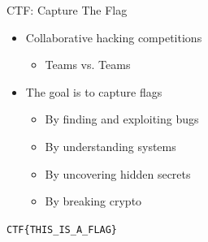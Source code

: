 {
\begin{frame}[t,plain]
    \titlepage
\end{frame}
}

\begin{frame}[fragile]
  {CTF: Capture The Flag}

  \begin{itemize}
    \item Collaborative hacking competitions
    \begin{itemize}
    	\item Teams vs. Teams
    \end{itemize}
    \item The goal is to capture flags
    \begin{itemize}
    	\item By finding and exploiting bugs
    	\item By understanding systems
    	\item By uncovering hidden secrets
    	\item By breaking crypto
    \end{itemize}
  \end{itemize}
\end{frame}

\begin{frame}
	\begin{center}
		\Huge\verb+CTF{THIS_IS_A_FLAG}+
	\end{center}
\end{frame}


